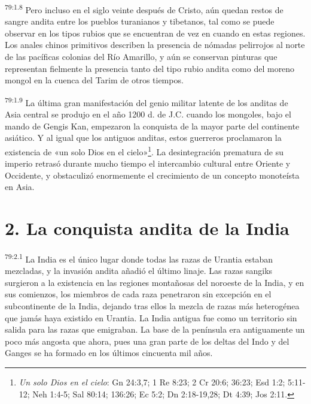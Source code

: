 \par
\textsuperscript{79:1.8} Pero incluso en el siglo veinte después de Cristo, aún quedan restos de sangre andita entre los pueblos turanianos y tibetanos, tal como se puede observar en los tipos rubios que se encuentran de vez en cuando en estas regiones. Los anales chinos primitivos describen la presencia de nómadas pelirrojos al norte de las pacíficas colonias del Río Amarillo, y aún se conservan pinturas que representan fielmente la presencia tanto del tipo rubio andita como del moreno mongol en la cuenca del Tarim de otros tiempos.

\par
\textsuperscript{79:1.9} La última gran manifestación del genio militar latente de los anditas de Asia central se produjo en el año 1200 d. de J.C. cuando los mongoles, bajo el mando de Gengis Kan, empezaron la conquista de la mayor parte del continente asiático. Y al igual que los antiguos anditas, estos guerreros proclamaron la existencia de «un solo Dios en el cielo»\footnote{\textit{Un solo Dios en el cielo}: Gn 24:3,7; 1 Re 8:23; 2 Cr 20:6; 36:23; Esd 1:2; 5:11-12; Neh 1:4-5; Sal 80:14; 136:26; Ec 5:2; Dn 2:18-19,28; Dt 4:39; Jos 2:11.}. La desintegración prematura de su imperio retrasó durante mucho tiempo el intercambio cultural entre Oriente y Occidente, y obstaculizó enormemente el crecimiento de un concepto monoteísta en Asia.

\section*{2. La conquista andita de la India}
\par
\textsuperscript{79:2.1} La India es el único lugar donde todas las razas de Urantia estaban mezcladas, y la invasión andita añadió el último linaje. Las razas sangiks surgieron a la existencia en las regiones montañosas del noroeste de la India, y en sus comienzos, los miembros de cada raza penetraron sin excepción en el subcontinente de la India, dejando tras ellos la mezcla de razas más heterogénea que jamás haya existido en Urantia. La India antigua fue como un territorio sin salida para las razas que emigraban. La base de la península era antiguamente un poco más angosta que ahora, pues una gran parte de los deltas del Indo y del Ganges se ha formado en los últimos cincuenta mil años.

